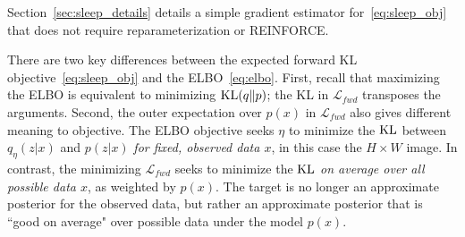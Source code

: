 Section~\ref{sec:sleep_details} details a simple gradient estimator for~\eqref{eq:sleep_obj} that does not require reparameterization or REINFORCE.

There are two key differences between the expected forward KL objective~\eqref{eq:sleep_obj}
and the ELBO~\eqref{eq:elbo}.
First, recall that maximizing the ELBO is equivalent to minimizing
$\textrm{KL}(q\|p)$; the KL in $\mathcal{L}_{fwd}$ transposes the arguments.
Second, the outer expectation over $p(x)$ in $\mathcal{L}_{fwd}$ also gives different meaning to objective.
The ELBO objective seeks $\eta$ to minimize the $\textrm{KL}$ between $q_\eta(z | x)$ and $p(z | x)$
{\itshape for fixed, observed data $x$},
in this case the $H\times W$ image.
In contrast, the minimizing $\mathcal{L}_{fwd}$ seeks to minimize the $\textrm{KL}$
{\itshape on average over all possible data $x$},
as weighted by $p(x)$.
The target is no longer an approximate posterior for the observed data, but rather
an approximate posterior that is ``good on average" over possible data under the model $p(x)$.

%
%
%
%


